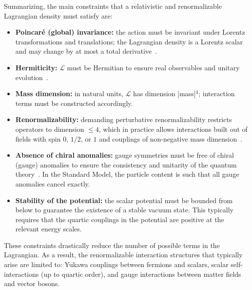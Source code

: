 Summarizing, the main constraints that a relativistic and renormalizable Lagrangian density must satisfy are:
\begin{itemize}
	\item \textbf{Poincaré (global) invariance:} the action must be invariant under Lorentz transformations and translations; the Lagrangian density is a Lorentz scalar and may change by at most a total derivative~\parencite{pall,jose1998classical}. 
	\item \textbf{Hermiticity:} $\mathcal{L}$ must be Hermitian to ensure real observables and unitary evolution~\parencite{pall,peskin}.
	\item \textbf{Mass dimension:} in natural units, $\mathcal{L}$ has dimension [mass]$^4$; interaction terms must be constructed accordingly.
	\item \textbf{Renormalizability:} demanding perturbative renormalizability restricts operators to dimension $\leq 4$, which in practice allows interactions built out of fields with spin $0$, $1/2$, or $1$ and couplings of non-negative mass dimension~\parencite{peskin,Weinberg}.
	\item \textbf{Absence of chiral anomalies:} gauge symmetries must be free of chiral (gauge) anomalies to ensure the consistency and unitarity of the quantum theory~\parencite{peskin,Weinberg,bertlmann1996anomalies}. In the Standard Model, the particle content is such that all gauge anomalies cancel exactly.
	\item \textbf{Stability of the potential:} the scalar potential must be bounded from below to guarantee the existence of a stable vacuum state. This typically requires that the quartic couplings in the potential are positive at the relevant energy scales.
\end{itemize}

These constraints drastically reduce the number of possible terms in the Lagrangian. As a result, the renormalizable interaction structures that typically arise are limited to: Yukawa couplings between fermions and scalars, scalar self-interactions (up to quartic order), and gauge interactions between matter fields and vector bosons.



